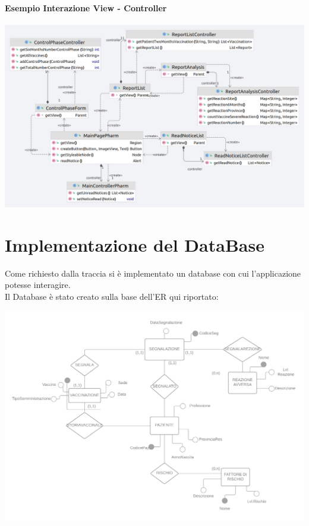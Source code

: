 \documentclass{article}
\begin{document}
    \paragraph*{Esempio Interazione View - Controller}
        \begin{center}
            \includegraphics[width=1\textwidth]{pictures/ExampleControlViewInteraction.png}
        \end{center}



\newpage
    \section{Implementazione del DataBase}
    Come richiesto dalla traccia si è implementato un database con cui l'applicazione potesse interagire.\\
    Il Database è stato creato sulla base dell'ER qui riportato:
        \begin{center}
            \includegraphics[width=1\textwidth]{pictures/_Diagramma vuoto.png}
        \end{center}
\end{document}
